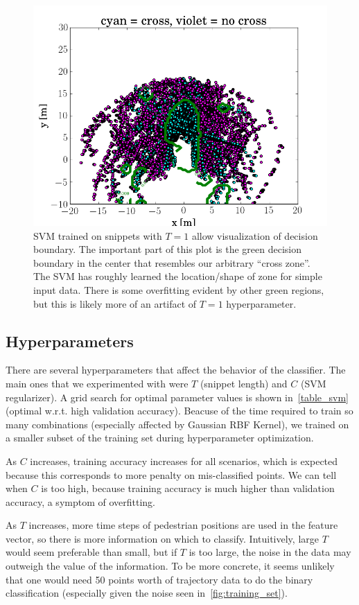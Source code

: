 \begin{figure}
	\centering
	\includegraphics [trim=0 0 0 0, clip, angle=0, width=0.8\columnwidth,
	keepaspectratio]{figures/svm_snippet1}
	\caption{SVM trained on snippets with $T=1$ allow visualization of decision boundary. The important part of this plot is the green decision boundary in the center that resembles our arbitrary ``cross zone''. The SVM has roughly learned the location/shape of zone for simple input data. There is some overfitting evident by other green regions, but this is likely more of an artifact of $T=1$ hyperparameter.} 
	\label{fig:svm_snippet1} 
\end{figure}

\subsection{Hyperparameters}
There are several hyperparameters that affect the behavior of the classifier.
The main ones that we experimented with were $T$ (snippet length) and $C$ (SVM regularizer).
A grid search for optimal parameter values is shown in~\cref{table_svm} (optimal w.r.t. high validation accuracy).
Beacuse of the time required to train so many combinations (especially affected by Gaussian RBF Kernel), we trained on a smaller subset of the training set during hyperparameter optimization.

As $C$ increases, training accuracy increases for all scenarios, which is expected because this corresponds to more penalty on mis-classified points.
We can tell when $C$ is too high, because training accuracy is much higher than validation accuracy, a symptom of overfitting.

As $T$ increases, more time steps of pedestrian positions are used in the feature vector, so there is more information on which to classify.
Intuitively, large $T$ would seem preferable than small, but if $T$ is too large, the noise in the data may outweigh the value of the information.
To be more concrete, it seems unlikely that one would need 50 points worth of trajectory data to do the binary classification (especially given the noise seen in~\cref{fig:training_set}).

